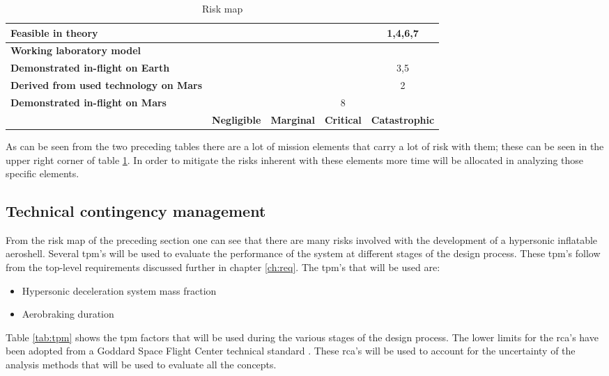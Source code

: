 \begin{table}[h]
\centering
\caption{Risk map}
\label{tab:riskmap}
    \begin{tabular}{|p{6.5cm}|c|c|c|c|}
    \hline
    \textbf{Feasible in theory} & \cellcolor{green} & \cellcolor{yellow} & \cellcolor{red} & \cellcolor{red} 1,4,6,7 \\ \hline
    \textbf{Working laboratory model} & \cellcolor{green} & \cellcolor{yellow} & \cellcolor{red} & \cellcolor{red} \\ \hline
    \textbf{Demonstrated in-flight on Earth} & \cellcolor{green} & \cellcolor{yellow} & \cellcolor{yellow} & \cellcolor{yellow} 3,5 \\ \hline
    \textbf{Derived from used technology on Mars} & \cellcolor{green} & \cellcolor{yellow} & \cellcolor{yellow} & \cellcolor{yellow} 2 \\ \hline
    \textbf{Demonstrated in-flight on Mars} & \cellcolor{green} & \cellcolor{green} & \cellcolor{green} 8 & \cellcolor{green} \\ \hline
     & \textbf{Negligible} & \textbf{Marginal} & \textbf{Critical} & \textbf{Catastrophic} \\ \hline
    \end{tabular}
\end{table}

As can be seen from the two preceding tables there are a lot of mission elements that carry a lot of risk with them; these can be seen in the upper right corner of table \ref{tab:riskmap}. In order to mitigate the risks inherent with these elements more time will be allocated in analyzing those specific elements.

\subsection{Technical contingency management}
\label{sec:tca}
From the risk map of the preceding section one can see that there are many risks involved with the development of a hypersonic inflatable aeroshell. Several \gls{tpm}'s  will be used to evaluate the performance of the system at different stages of the design process. These \gls{tpm}'s follow from the top-level requirements discussed further in chapter \ref{ch:req}. The \gls{tpm}'s that will be used are:
\begin{itemize}
	\item Hypersonic deceleration system mass fraction
	\item Aerobraking duration
\end{itemize}
Table \ref{tab:tpm} shows the \acrfull{tpm} factors that will be used during the various stages of the design process. The lower limits for the \gls{rca}'s have been adopted from a Goddard Space Flight Center technical standard \cite{GoddardSpaceFlightCenter2013}. These \gls{rca}'s will be used to account for the uncertainty of the analysis methods that will be used to evaluate all the concepts.

